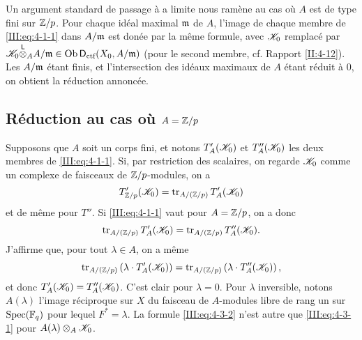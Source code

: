 Un argument standard de passage \`a a limite nous ram\`ene au cas o\`u $A$ est 
de type fini sur $\mathbb{Z}/p$. Pour chaque id\'eal maximal $\mathfrak{m}$ de $A$, l'image de 
chaque membre de \eqref{III:eq:4-1-1} dans $A/\mathfrak{m}$ est don\'ee par la m\^eme 
formule, avec $\mathscr{K}_0$ remplac\'e par 
$\mathscr{K}_0{\overset{\mathsf{L}}{\otimes}}_A A/\mathfrak{m}\in\operatorname{Ob}\mathsf{D}_\text{ctf}(X_0,A/\mathfrak{m})$ (pour le second membre, 
cf. Rapport \ref{II:4-12}). Les $A/\mathfrak{m}$ \'etant finis, et l'intersection des 
id\'eaux maximaux de $A$ \'etant r\'eduit \`a $0$, on obtient la r\'eduction 
annonc\'ee.





\subsection{R\'eduction au cas o\`u \texorpdfstring{$A=\mathbb{Z}/p$}{A=Z/p}}\label{III:4-3}

Supposons que $A$ soit un corps fini, et notons $T_A'(\mathscr{K}_0)$ et $T_A''(\mathscr{K}_0)$ 
les deux membres de \eqref{III:eq:4-1-1}. Si, par restriction des scalaires, on 
regarde $\mathscr{K}_0$ comme un complexe de faisceaux de $\mathbb{Z}/p$-modules, on a 
\[
  T_{\mathbb{Z}/p}'(\mathscr{K}_0) = \operatorname{tr}_{A/(\mathbb{Z}/p)} T_A'(\mathscr{K}_0)
\]
et de m\^eme pour $T''$. Si \eqref{III:eq:4-1-1} vaut pour $A=\mathbb{Z}/p$, on a donc 
\begin{equation}\label{III:eq:4-3-1}
  \operatorname{tr}_{A/(\mathbb{Z}/p)} T_A'(\mathscr{K}_0) = \operatorname{tr}_{A/(\mathbb{Z}/p)} T_A''(\mathscr{K}_0) \text{.}
\end{equation}
J'affirme que, pour tout $\lambda\in A$, on a m\^eme 
\begin{equation}\label{III:eq:4-3-2}
  \operatorname{tr}_{A/(\mathbb{Z}/p)}\left(\lambda\cdot T_A'(\mathscr{K}_0)\right) = \operatorname{tr}_{A/(\mathbb{Z}/p)}\left(\lambda\cdot T_A''(\mathscr{K}_0)\right) \text{,}
\end{equation}
et donc $T_A'(\mathscr{K}_0) = T_A''(\mathscr{K}_0)$. C'est clair pour $\lambda=0$. Pour 
$\lambda$ inversible, notons $A(\lambda)$ l'image r\'eciproque sur $X$ du 
faisceau de $A$-modules libre de rang un sur $\operatorname{Spec}(\mathbb{F}_q)$ pour lequel 
$F^*=\lambda$. La formule \eqref{III:eq:4-3-2} n'est autre que 
\eqref{III:eq:4-3-1} pour $A(\lambda)\otimes_A \mathscr{K}_0$. 





